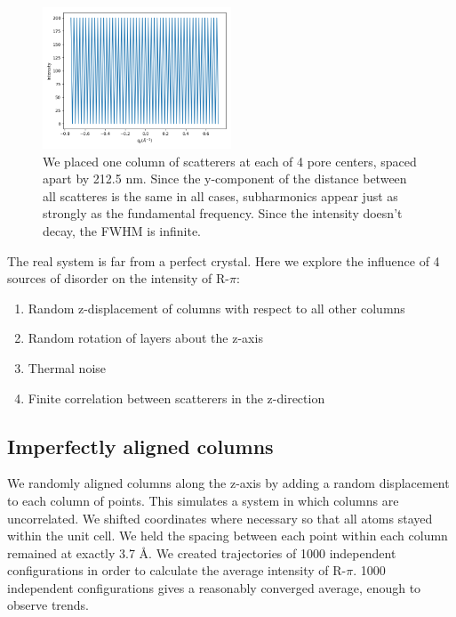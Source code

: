 \documentclass{article}
\begin{document}
  \begin{figure}[!htb]
  \centering
  \includegraphics[width=0.5\textwidth]{one_column_per_pore.png}
  \caption{We placed one column of scatterers at each of 4 pore centers, spaced apart by
  212.5 nm. Since the y-component of the distance between all scatteres is the same in 
  all cases, subharmonics appear just as strongly as the fundamental frequency. Since the 
  intensity doesn't decay, the FWHM is infinite.}\label{fig:infinite_FWHM}
  \end{figure}


  The real system is far from a perfect crystal. Here we explore the influence
  of 4 sources of disorder on the intensity of R-$\pi$:
  \begin{enumerate}
  \item Random z-displacement of columns with respect to all other columns
  \item Random rotation of layers about the z-axis
  \item Thermal noise
  \item Finite correlation between scatterers in the z-direction
  \end{enumerate}

  \subsection{Imperfectly aligned columns}

  We randomly aligned columns along the z-axis by adding a random displacement
  to each column of points. This simulates a system in which columns are
  uncorrelated.  We shifted coordinates where necessary so that all atoms stayed
  within the unit cell. We held the spacing between each point within each column
  remained at exactly 3.7 \AA. We created  trajectories of 1000 independent
  configurations in order to calculate the average intensity of R-$\pi$. 1000
  independent configurations gives a reasonably converged average, enough to
  observe trends.
\end{document}
